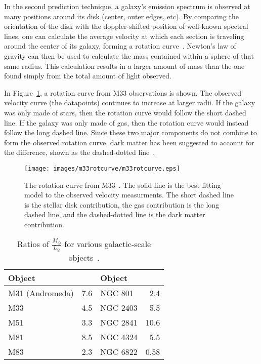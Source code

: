 In the second prediction technique, a galaxy's emission spectrum is observed at many positions around its disk (center, outer edges, etc).
By comparing the orientation of the disk with the doppler-shifted position of well-known spectral lines, one can calculate the average velocity at which each section is traveling around the center of its galaxy, forming a rotation curve~\cite{rotation_curve_review, spiral_galaxy_rot_curve, milkyway_dm_evidence}.
Newton's law of gravity can then be used to calculate the mass contained within a sphere of that same radius.
This calculation results in a larger amount of mass than the one found simply from the total amount of light observed.

In Figure~\ref{fig:m33rotcurve}, a rotation curve from M33 observations is shown.
The observed velocity curve (the datapoints) continues to increase at larger radii.
If the galaxy was only made of stars, then the rotation curve would follow the short dashed line.
If the galaxy was only made of gas, then the rotation curve would instead follow the long dashed line.
Since these two major components do not combine to form the observed rotation curve, dark matter has been suggested to account for the difference, shown as the dashed-dotted line~\cite{m33rotcurve}.
    
\begin{figure}[bt]
  \centering
  \texttt{[image: images/m33rotcurve/m33rotcurve.eps]}
  \caption[M33 Rotation Curve]{
    The rotation curve from M33~\cite{m33rotcurve}.
    The solid line is the best fitting model to the observed velocity measurments.
    The short dashed line is the stellar disk contribution, the gas contribution is the long dashed line, and the dashed-dotted line is the dark matter contribution.
  }
  \label{fig:m33rotcurve}
\end{figure}

\begin{table}[h]
  \centering
  \caption[Ratios of $\frac{\textrm{M}_\odot}{\textrm{L}_\odot}$ for Various Galactic-scale Objects]{Ratios of $\frac{M_\odot}{L_\odot}$ for various galactic-scale objects~\cite{faber_ml}.}
  \label{tab:mlratios}
  \begin{tabular}{l r | l r}
    Object      &  \mlratio{} & Object & \mlratio{} \\
    \hline
    M31 (Andromeda) &  7.6  & NGC 801  &  2.4  \\
    M33             &  4.5  & NGC 2403 &  5.5  \\
    M51             &  3.3  & NGC 2841 & 10.6  \\
    M81             &  8.5  & NGC 4324 &  5.5  \\
    M83             &  2.3  & NGC 6822 &  0.58 \\
  \end{tabular}
\end{table}
      

